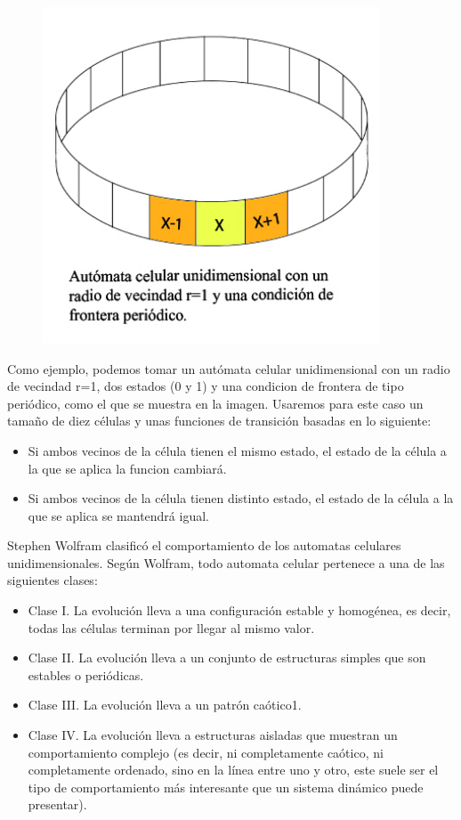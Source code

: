 \documentclass[14pt]{article}
\begin{document}
\begin{figure}[htp]
\centering
\includegraphics[width=10.0cm]{01.jpg}
\label{fig:lion}
\end{figure}

Como ejemplo, podemos tomar un autómata celular unidimensional con un radio de vecindad r=1, dos estados (0 y 1) y una condicion de frontera de tipo periódico, como el que se muestra en la imagen. Usaremos para este caso un tamaño de diez células y unas funciones de transición basadas en lo siguiente: 
\begin{itemize}
  \item Si ambos vecinos de la célula tienen el mismo estado, el estado de la célula a la que se aplica la funcion cambiará.
  \item Si ambos vecinos de la célula tienen distinto estado, el estado de la célula a la que se aplica se mantendrá igual.
\end{itemize}

\clearpage

Stephen Wolfram clasificó el comportamiento de los automatas celulares unidimensionales. Según Wolfram, todo automata celular pertenece a una de las siguientes clases:

\begin{itemize}
  \item Clase I. La evolución lleva a una configuración estable y homogénea, es decir, todas las células terminan por llegar al mismo valor.
  \item Clase II. La evolución lleva a un conjunto de estructuras simples que son estables o periódicas.
  \item Clase III. La evolución lleva a un patrón caótico1.
  \item Clase IV. La evolución lleva a estructuras aisladas que muestran un comportamiento complejo (es decir, ni completamente caótico, ni completamente ordenado, sino en la línea entre uno y otro, este suele ser el tipo de comportamiento más interesante que un sistema dinámico puede presentar).
\end{itemize}
\end{document}

